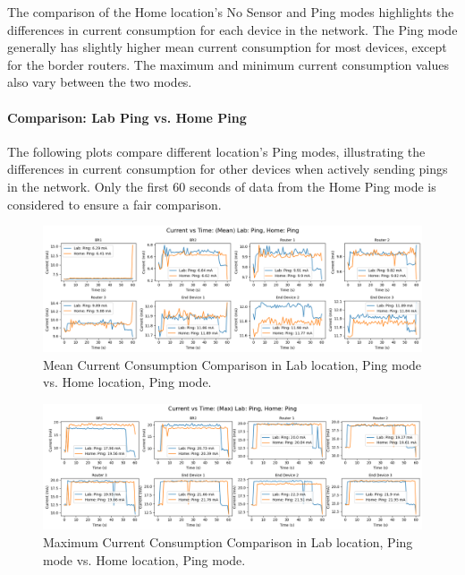 The comparison of the Home location's No Sensor and Ping modes highlights the differences in current consumption for each device in the network. The Ping mode generally has slightly higher mean current consumption for most devices, except for the border routers. The maximum and minimum current consumption values also vary between the two modes.

\paragraph{Comparison: Lab Ping vs. Home Ping}
The following plots compare different location's Ping modes, illustrating the differences in current consumption for other devices when actively sending pings in the network. Only the first 60 seconds of data from the Home Ping mode is considered to ensure a fair comparison.

\begin{figure}[H]
  \centering
  \includegraphics[width=1\textwidth]{images/research_results/current_consumption_analysis/maximum/home/ping/comparison/lab_ping_vs_home_ping/mean_comparison_lab_ping_vs_home_ping.png}
    \caption{Mean Current Consumption Comparison in Lab location, Ping mode vs. Home location, Ping mode.}
    \label{fig:mean_comparison_lab_ping_vs_home_ping}
\end{figure}

\begin{figure}[H]
  \centering
  \includegraphics[width=1\textwidth]{images/research_results/current_consumption_analysis/maximum/home/ping/comparison/lab_ping_vs_home_ping/max_comparison_lab_ping_vs_home_ping.png}
    \caption{Maximum Current Consumption Comparison in Lab location, Ping mode vs. Home location, Ping mode.}
    \label{fig:max_comparison_lab_ping_vs_home_ping}
\end{figure}


